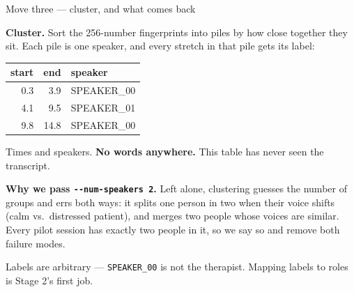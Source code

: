\documentclass[aspectratio=169]{beamer}
\begin{document}
\begin{frame}{Move three --- cluster, and what comes back}

\textbf{Cluster.} Sort the 256-number fingerprints into piles by how close together they
sit. Each pile is one speaker, and every stretch in that pile gets its label:

\begin{center}
\small
\begin{tabular}{rrl}
\toprule
\textbf{start} & \textbf{end} & \textbf{speaker} \\
\midrule
0.3 & 3.9 & SPEAKER\_00 \\
4.1 & 9.5 & SPEAKER\_01 \\
9.8 & 14.8 & SPEAKER\_00 \\
\bottomrule
\end{tabular}
\end{center}

\vspace{0.5em}
Times and speakers. \textbf{No words anywhere.} This table has never seen the transcript.

\vspace{0.5em}
\textbf{Why we pass \texttt{-{}-num-speakers 2}.} Left alone, clustering guesses the number
of groups and errs both ways: it splits one person in two when their voice shifts (calm
vs.\ distressed patient), and merges two people whose voices are similar. Every pilot
session has exactly two people in it, so we say so and remove both failure modes.

\vspace{0.3em}
Labels are arbitrary --- \texttt{SPEAKER\_00} is not the therapist. Mapping labels to roles
is Stage 2's first job.

\end{frame}
\end{document}
